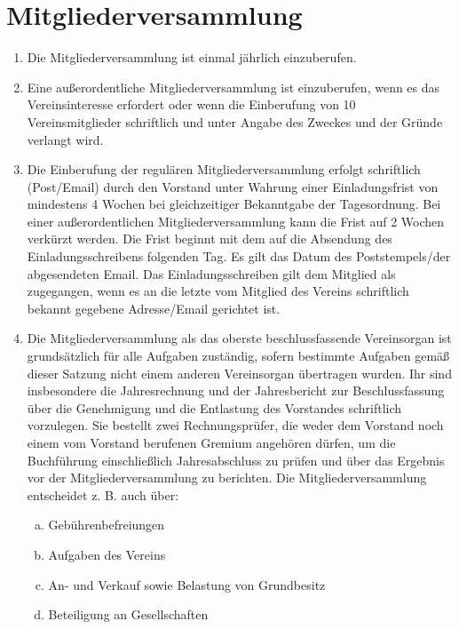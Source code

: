 \documentclass[a5paper, ngerman, 10pt]{scrreprt}
\begin{document}
\section{Mitgliederversammlung}
\begin{enumerate}[(1)]
    \item Die Mitgliederversammlung ist einmal jährlich einzuberufen.
    \item Eine außerordentliche Mitgliederversammlung ist einzuberufen, wenn es
        das Vereinsinteresse erfordert oder wenn die Einberufung von 10%
        Vereinsmitglieder schriftlich und unter Angabe des Zweckes und der
        Gründe verlangt wird.
    \item Die Einberufung der regulären Mitgliederversammlung erfolgt
        schriftlich (Post/Email) durch den Vorstand unter Wahrung einer
        Einladungsfrist von mindestens 4 Wochen bei gleichzeitiger Bekanntgabe
        der Tagesordnung. Bei einer außerordentlichen Mitgliederversammlung
        kann die Frist auf 2 Wochen verkürzt werden. Die Frist beginnt mit dem
        auf die Absendung des Einladungsschreibens folgenden Tag. Es gilt das
        Datum des Poststempels/der abgesendeten Email. Das Einladungsschreiben
        gilt dem Mitglied als zugegangen, wenn es an die letzte vom Mitglied
        des Vereins schriftlich bekannt gegebene Adresse/Email gerichtet ist.
    \item Die Mitgliederversammlung als das oberste beschlussfassende
        Vereinsorgan ist grundsätzlich für alle Aufgaben zuständig, sofern
        bestimmte Aufgaben gemäß dieser Satzung nicht einem anderen
        Vereinsorgan übertragen wurden. Ihr sind insbesondere die
        Jahresrechnung und der Jahresbericht zur Beschlussfassung über die
        Genehmigung und die Entlastung des Vorstandes schriftlich vorzulegen.
        Sie bestellt zwei Rechnungsprüfer, die weder dem Vorstand noch einem
        vom Vorstand berufenen Gremium angehören dürfen, um die Buchführung
        einschließlich Jahresabschluss zu prüfen und über das Ergebnis vor der
        Mitgliederversammlung zu berichten. Die Mitgliederversammlung
        entscheidet z. B. auch über:
    \begin{enumerate}[a.]
        \item Gebührenbefreiungen
        \item Aufgaben des Vereins
        \item An- und Verkauf sowie Belastung von Grundbesitz
        \item Beteiligung an Gesellschaften

\end{enumerate}
\end{enumerate}
\end{document}

